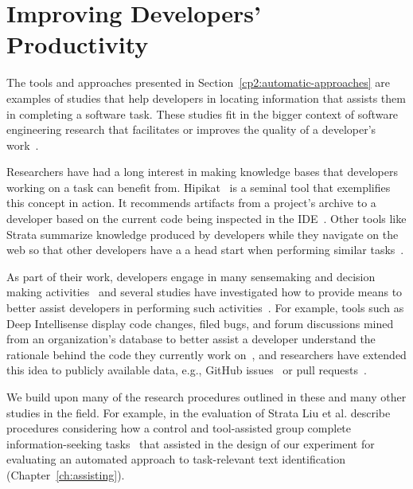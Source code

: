



\section{Improving Developers' Productivity}
\label{cp2:dev-productivity}



The tools and approaches presented in Section~\ref{cp2:automatic-approaches}
are examples of studies that help developers in locating 
information that assists them in completing a software task.
These studies fit in the bigger context 
of software engineering research 
that facilitates or improves the quality of a developer's work~\cite{Kersten2006, Meyer2017, satterfield2020}. 



Researchers have had a long interest in 
making knowledge bases
that developers working on a task can benefit from. 
Hipikat~\cite{Cubranic2005} is a seminal tool that exemplifies this concept in action.
It recommends artifacts from a project's archive to 
a developer 
based on the current code being inspected in the IDE~\cite{Cubranic2005}.
Other tools like Strata summarize knowledge produced by developers 
while they navigate on the web so that other developers have a 
a head start when performing similar tasks~\cite{liu2021}.



As part of their work, developers engage in many sensemaking and decision making activities~\cite{sillito2006} and several studies have investigated how to 
provide means to better  
assist developers in performing such activities~\cite{Liu2018Unakite, liu2021, barnett2015}.
For example, tools such as Deep Intellisense 
display code changes, filed bugs, and forum discussions 
mined from an organization's database to better assist a developer
understand 
the rationale behind the code they currently work on~\cite{Holmes2008},
and researchers have extended this idea to  
publicly available data, e.g., GitHub issues~\cite{Viviani2019}
or pull requests~\cite{freire2021}. 



We build upon many of the research procedures outlined 
in these and many other studies in the field. 
For example, in the evaluation of Strata 
 Liu et al. describe procedures 
considering how a control and tool-assisted group 
complete information-seeking tasks~\cite{liu2021}
that assisted in the design of our experiment for 
evaluating an automated approach to
task-relevant text identification (Chapter~\ref{ch:assisting}).



